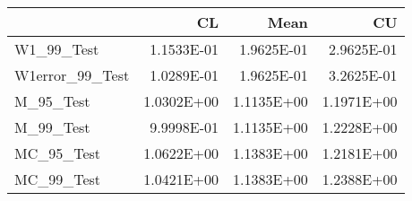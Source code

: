 \begin{tabular}{lrrr}
\toprule
{} &         CL &       Mean &         CU \\
\midrule
W1\_99\_Test      & 1.1533E-01 & 1.9625E-01 & 2.9625E-01 \\
W1error\_99\_Test & 1.0289E-01 & 1.9625E-01 & 3.2625E-01 \\
M\_95\_Test       & 1.0302E+00 & 1.1135E+00 & 1.1971E+00 \\
M\_99\_Test       & 9.9998E-01 & 1.1135E+00 & 1.2228E+00 \\
MC\_95\_Test      & 1.0622E+00 & 1.1383E+00 & 1.2181E+00 \\
MC\_99\_Test      & 1.0421E+00 & 1.1383E+00 & 1.2388E+00 \\
\bottomrule
\end{tabular}
